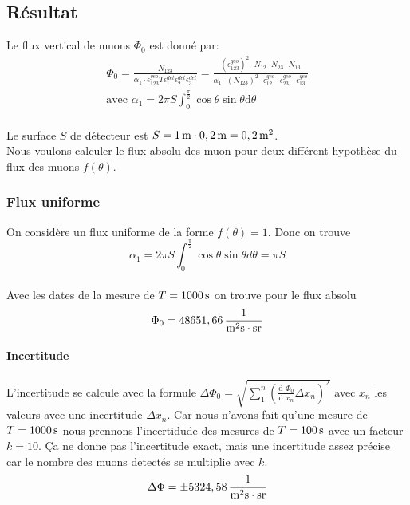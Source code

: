 \documentclass[a4paper,11pt,liststotocnumbered,bibtotocnumbered]{scrartcl}
\begin{document}
  \subsection{Résultat}
   Le flux vertical de muons $\Phi_0$ est donné par:
   \begin{eqnarray*}
    \Phi_0=\frac{N_{123}}{\alpha_1\cdot \epsilon_{123}^{geo}T\epsilon_{1}^{det}\epsilon_{2}^{det}\epsilon_{3}^{det}}=\frac{\left(\epsilon_{123}^{geo}\right)^2 \cdot N_{12}\cdot N_{23}\cdot N_{13}}{\alpha_1 \cdot \left(N_{123}\right)^2 \cdot \epsilon_{12}^{geo}\cdot \epsilon_{23}^{geo}\cdot \epsilon_{13}^{geo}}\\
    \text{avec }\alpha_1=2\pi S\int_0^{\frac{\pi}{2}}\cos\theta \sin\theta\text{d} \theta
   \end{eqnarray*}\\
   Le surface $S$ de détecteur est $S=\unit[1]{m}\cdot\unit[0,2]{m}=\unit[0,2]{m^2}$.\\
   Nous voulons calculer le flux absolu des muon pour deux différent hypothèse du flux des muons $f(\theta)$.
  
   \subsubsection{Flux uniforme}
    On considère un flux uniforme de la forme $f(\theta)=1$. Donc on trouve
    \begin{equation*}
     \alpha_1=2\pi S\int_0^{\frac{\pi}{2}}\cos\theta \sin\theta d \theta=\pi S
    \end{equation*}\\
    Avec les dates de la mesure de $T=\unit[1000]{s}$ on trouve pour le flux absolu
    \begin{equation*}
     \Phi_0=\unit[48651,66]{\frac{1}{m^2s\cdot sr}}
    \end{equation*}
    \paragraph{Incertitude}
    L'incertitude se calcule avec la formule $\Delta\Phi_0=\sqrt{\sum_1^n \left(\frac{\text{d }\Phi_0}{\text{d }x_n}\Delta x_n\right)^2}$ avec $x_n$ les valeurs avec une incertitude $\Delta x_n$. Car nous n'avons fait qu'une mesure de $T=\unit[1000]{s}$ nous prennons l'incertidude des mesures de $T=\unit[100]{s}$ avec un facteur $k=10$. \c Ca ne donne pas l'incertitude exact, mais une incertitude assez précise car le nombre des muons detectés se multiplie avec $k$.
    \begin{equation*}
     \Delta\Phi=\pm \unit[5324,58]{\frac{1}{m^2s\cdot sr}}
    \end{equation*}
\end{document}
